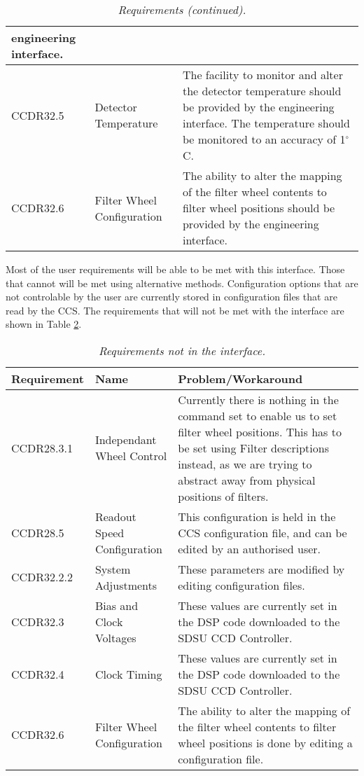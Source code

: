 \documentclass[10pt,a4paper]{article}
\begin{document}
\begin{table}[!h]
\begin{center}
\begin{tabular}{|l|l|p{25em}|}
		engineering interface.\\ \hline
CCDR32.5	& Detector Temperature &The facility to monitor and alter the detector temperature should be provided 
		by the engineering interface.
		The temperature should be monitored to an accuracy of 1$^\circ$ C.\\ \hline
CCDR32.6	& Filter Wheel Configuration & The ability to alter the mapping of the filter wheel contents to 
		filter wheel positions should be provided by the engineering interface.\\ \hline
\end{tabular}
\end{center}
\caption{\em Requirements (continued).}
\label{tab:requirements2}
\end{table}

Most of the user requirements will be able to be met with this interface. Those that cannot will
be met using alternative methods. Configuration options that are not controlable by the user are currently
stored in configuration files that are read by the CCS. The requirements that will not be met with the
 interface are shown in Table \ref{tab:nireq}.

\begin{table}[!h]
\begin{center}
\begin{tabular}{|l|l|p{25em}|}
\hline
{\bf Requirement} & {\bf Name} & {\bf Problem/Workaround} \\ \hline
CCDR28.3.1	& Independant Wheel Control & Currently there is nothing in the command set to enable us to set
		filter wheel positions. This has to be set using Filter descriptions instead, as we are trying to
		abstract away from physical positions of filters.\\ \hline
CCDR28.5	& Readout Speed Configuration & This configuration is held in the CCS configuration file, and can be
		edited by an authorised user.\\ \hline
CCDR32.2.2	& System Adjustments & These parameters are modified by editing configuration files.\\ \hline
CCDR32.3	& Bias and Clock Voltages & 
		These values are currently set in the DSP code downloaded to the SDSU CCD Controller.\\ \hline
CCDR32.4	& Clock Timing & 
		These values are currently set in the DSP code downloaded to the SDSU CCD Controller.\\ \hline
CCDR32.6	& Filter Wheel Configuration & The ability to alter the mapping of the filter wheel contents to 
		filter wheel positions is done by editing a configuration file.\\ \hline
\end{tabular}
\end{center}
\caption{\em Requirements not in the interface.}
\label{tab:nireq}
\end{table}
\end{document}
